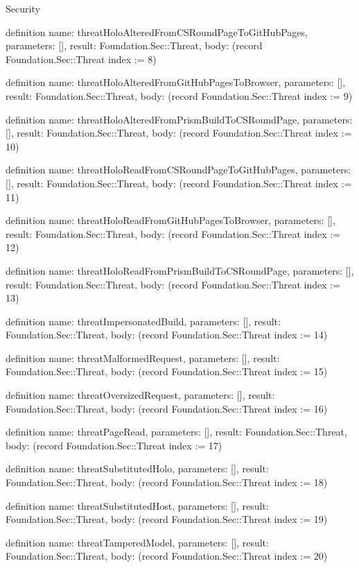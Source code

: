 \begin{lexlean}{Security}
\begin{semanticmodule}
definition{
  name: threatHoloAlteredFromCSRoundPageToGitHubPages,
  parameters: [],
  result: Foundation.Sec::Threat,
  body: (record Foundation.Sec::Threat {index := 8})
}

definition{
  name: threatHoloAlteredFromGitHubPagesToBrowser,
  parameters: [],
  result: Foundation.Sec::Threat,
  body: (record Foundation.Sec::Threat {index := 9})
}

definition{
  name: threatHoloAlteredFromPrismBuildToCSRoundPage,
  parameters: [],
  result: Foundation.Sec::Threat,
  body: (record Foundation.Sec::Threat {index := 10})
}

definition{
  name: threatHoloReadFromCSRoundPageToGitHubPages,
  parameters: [],
  result: Foundation.Sec::Threat,
  body: (record Foundation.Sec::Threat {index := 11})
}

definition{
  name: threatHoloReadFromGitHubPagesToBrowser,
  parameters: [],
  result: Foundation.Sec::Threat,
  body: (record Foundation.Sec::Threat {index := 12})
}

definition{
  name: threatHoloReadFromPrismBuildToCSRoundPage,
  parameters: [],
  result: Foundation.Sec::Threat,
  body: (record Foundation.Sec::Threat {index := 13})
}

definition{
  name: threatImpersonatedBuild,
  parameters: [],
  result: Foundation.Sec::Threat,
  body: (record Foundation.Sec::Threat {index := 14})
}

definition{
  name: threatMalformedRequest,
  parameters: [],
  result: Foundation.Sec::Threat,
  body: (record Foundation.Sec::Threat {index := 15})
}

definition{
  name: threatOversizedRequest,
  parameters: [],
  result: Foundation.Sec::Threat,
  body: (record Foundation.Sec::Threat {index := 16})
}

definition{
  name: threatPageRead,
  parameters: [],
  result: Foundation.Sec::Threat,
  body: (record Foundation.Sec::Threat {index := 17})
}

definition{
  name: threatSubstitutedHolo,
  parameters: [],
  result: Foundation.Sec::Threat,
  body: (record Foundation.Sec::Threat {index := 18})
}

definition{
  name: threatSubstitutedHost,
  parameters: [],
  result: Foundation.Sec::Threat,
  body: (record Foundation.Sec::Threat {index := 19})
}

definition{
  name: threatTamperedModel,
  parameters: [],
  result: Foundation.Sec::Threat,
  body: (record Foundation.Sec::Threat {index := 20})
}


\end{semanticmodule}
\end{lexlean}
